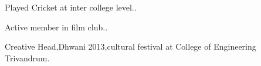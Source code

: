 \begin{cvitems}
        \item {Played Cricket at inter college level..}
        \item {Active member in film club..}
        \item {Creative Head,Dhwani 2013,cultural festival at College of Engineering Trivandrum.}
\end{cvitems}


